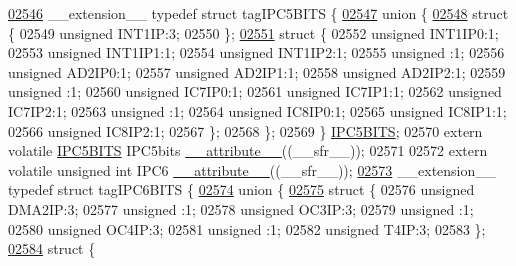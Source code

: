 \begin{DoxyCode}
\hypertarget{a00009_source_l02546}{}\hyperlink{a00008}{02546} \_\_extension\_\_ \textcolor{keyword}{typedef} \textcolor{keyword}{struct }tagIPC5BITS \{
\hypertarget{a00009_source_l02547}{}\hyperlink{a00009}{02547}   \textcolor{keyword}{union }\{
\hypertarget{a00009_source_l02548}{}\hyperlink{a00009}{02548}     \textcolor{keyword}{struct }\{
02549       \textcolor{keywordtype}{unsigned} INT1IP:3;
02550     \};
\hypertarget{a00009_source_l02551}{}\hyperlink{a00009}{02551}     \textcolor{keyword}{struct }\{
02552       \textcolor{keywordtype}{unsigned} INT1IP0:1;
02553       \textcolor{keywordtype}{unsigned} INT1IP1:1;
02554       \textcolor{keywordtype}{unsigned} INT1IP2:1;
02555       \textcolor{keywordtype}{unsigned} :1;
02556       \textcolor{keywordtype}{unsigned} AD2IP0:1;
02557       \textcolor{keywordtype}{unsigned} AD2IP1:1;
02558       \textcolor{keywordtype}{unsigned} AD2IP2:1;
02559       \textcolor{keywordtype}{unsigned} :1;
02560       \textcolor{keywordtype}{unsigned} IC7IP0:1;
02561       \textcolor{keywordtype}{unsigned} IC7IP1:1;
02562       \textcolor{keywordtype}{unsigned} IC7IP2:1;
02563       \textcolor{keywordtype}{unsigned} :1;
02564       \textcolor{keywordtype}{unsigned} IC8IP0:1;
02565       \textcolor{keywordtype}{unsigned} IC8IP1:1;
02566       \textcolor{keywordtype}{unsigned} IC8IP2:1;
02567     \};
02568   \};
02569 \} \hyperlink{a00008_dd/de9/a00552}{IPC5BITS};
02570 \textcolor{keyword}{extern} \textcolor{keyword}{volatile} \hyperlink{a00008_dd/de9/a00552}{IPC5BITS} IPC5bits \hyperlink{a00009_a493c46f03454991ccc5aa7a6e1dfb2a7}{\_\_attribute\_\_}((\_\_sfr\_\_));
02571 
02572 \textcolor{keyword}{extern} \textcolor{keyword}{volatile} \textcolor{keywordtype}{unsigned} \textcolor{keywordtype}{int}  IPC6 \hyperlink{a00009_a493c46f03454991ccc5aa7a6e1dfb2a7}{\_\_attribute\_\_}((\_\_sfr\_\_));
\hypertarget{a00009_source_l02573}{}\hyperlink{a00008}{02573} \_\_extension\_\_ \textcolor{keyword}{typedef} \textcolor{keyword}{struct }tagIPC6BITS \{
\hypertarget{a00009_source_l02574}{}\hyperlink{a00009}{02574}   \textcolor{keyword}{union }\{
\hypertarget{a00009_source_l02575}{}\hyperlink{a00009}{02575}     \textcolor{keyword}{struct }\{
02576       \textcolor{keywordtype}{unsigned} DMA2IP:3;
02577       \textcolor{keywordtype}{unsigned} :1;
02578       \textcolor{keywordtype}{unsigned} OC3IP:3;
02579       \textcolor{keywordtype}{unsigned} :1;
02580       \textcolor{keywordtype}{unsigned} OC4IP:3;
02581       \textcolor{keywordtype}{unsigned} :1;
02582       \textcolor{keywordtype}{unsigned} T4IP:3;
02583     \};
\hypertarget{a00009_source_l02584}{}\hyperlink{a00009}{02584}     \textcolor{keyword}{struct }\{

\end{DoxyCode}
